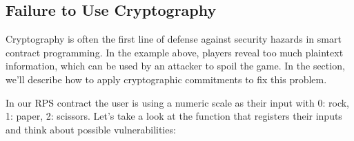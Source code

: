 \documentclass[10pt,twocolumn,letterpaper]{article}
\newcommand{\elaine}[1]{{\color{red}{[elaine: #1]}}}
\newcommand{\ignore}[1]{}
\begin{document}
\ignore{
So how do we fix these issues? It seems like our contract needs the ability to give refunds to users who try to sign up too late. Think about how you would do this. Go ahead and try it and see if your idea works! Are there any other edge cases where issuing a refund should be considered? Look at the section "Sending Wei" in the Serpent Tutorial for inspiration.
}

\subsection{Failure to Use Cryptography}
Cryptography is often the first line of defense against security hazards in smart contract programming. In the example above, players reveal too much plaintext information, which can be used by an attacker to spoil the game. In the section, we'll describe how to apply cryptographic commitments to fix this problem.

In our RPS contract the user is using a numeric scale as their input with 0: rock, 1: paper, 2: scissors. Let's take a look at the function that registers their inputs and think about possible vulnerabilities:


\elaine{in figures, can we put in framed boxes the lines
that have problems.}
\end{document}
